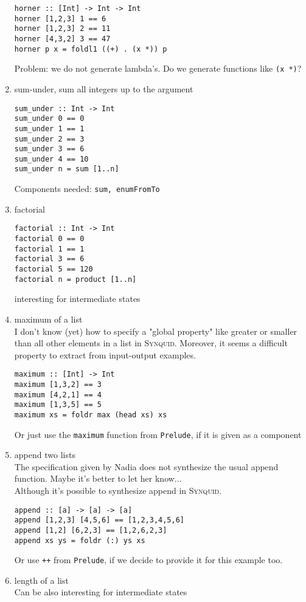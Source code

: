 \begin{enumerate}
\begin{lstlisting}
horner :: [Int] -> Int -> Int
horner [1,2,3] 1 == 6
horner [1,2,3] 2 == 11
horner [4,3,2] 3 == 47
horner p x = foldl1 ((+) . (x *)) p
	\end{lstlisting}
	Problem: we do not generate lambda's. Do we generate functions like \lstinline?(x *)??
%
	\item sum-under, sum all integers up to the argument
	\begin{lstlisting}
sum_under :: Int -> Int
sum_under 0 == 0
sum_under 1 == 1
sum_under 2 == 3
sum_under 3 == 6
sum_under 4 == 10
sum_under n = sum [1..n]
	\end{lstlisting}
	Components needed: \lstinline?sum, enumFromTo?
%
	\item factorial \\
	\begin{lstlisting}
factorial :: Int -> Int
factorial 0 == 0
factorial 1 == 1
factorial 3 == 6
factorial 5 == 120
factorial n = product [1..n]
	\end{lstlisting}
	interesting for intermediate states
%
	\item maximum of a list\\
	I don't know (yet) how to specify a "global property" like greater or smaller than all other elements in a list in \textsc{Synquid}. Moreover, it seems a difficult property to extract from input-output examples.
	\begin{lstlisting}
maximum :: [Int] -> Int
maximum [1,3,2] == 3
maximum [4,2,1] == 4
maximum [1,3,5] == 5
maximum xs = foldr max (head xs) xs
	\end{lstlisting}
	Or just use the \lstinline?maximum? function from \lstinline?Prelude?, if it is given as a component
%
	\item append two lists\\
	The specification given by Nadia does not synthesize the usual append function. Maybe it's better to let her know...\\
	Although it's possible to synthesize append in \textsc{Synquid}.
	\begin{lstlisting}
append :: [a] -> [a] -> [a]
append [1,2,3] [4,5,6] == [1,2,3,4,5,6]
append [1,2] [6,2,3] == [1,2,6,2,3]
append xs ys = foldr (:) ys xs
	\end{lstlisting}
	Or use \lstinline?++? from \lstinline?Prelude?, if we decide to provide it for this example too.
%
	\item length of a list \\
	Can be also interesting for intermediate states
	\begin{lstlisting}

\end{lstlisting}
\end{enumerate}
